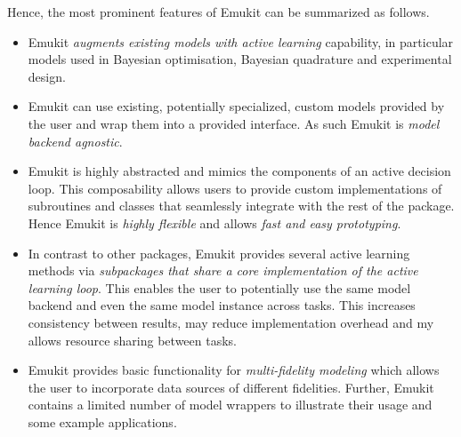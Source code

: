 Hence, the most prominent features of Emukit can be summarized as follows.

\begin{itemize}
\item Emukit \emph{augments existing models with active learning} capability, in particular models used in Bayesian optimisation, Bayesian quadrature and experimental design.
\item Emukit can use existing, potentially specialized, custom models provided by the user and wrap them into a provided interface. As such Emukit is \emph{model backend agnostic}.
\item Emukit is highly abstracted and mimics the components of an active decision loop. This composability allows users to provide custom implementations of subroutines and classes that seamlessly integrate with the rest of the package. Hence Emukit is \emph{highly flexible} and allows \emph{fast and easy prototyping}.
\item In contrast to other packages, Emukit provides several active learning methods via \emph{subpackages that share a core implementation of the active learning loop}. This enables the user to potentially use the same model backend and even the same model instance across tasks. This increases consistency between results, may reduce implementation overhead and my allows resource sharing between tasks.
\item Emukit provides basic functionality for \emph{multi-fidelity modeling} which allows the user to incorporate data sources of different fidelities. Further, Emukit contains a limited number of model wrappers to illustrate their usage and some example applications.
\end{itemize}


